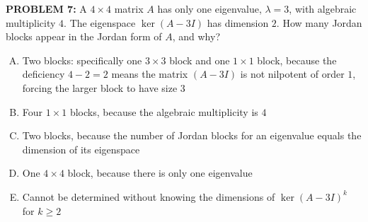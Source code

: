\documentclass[12pt]{amsart}
\begin{document}
{\bf PROBLEM 7:}
%
A $4 \times 4$ matrix $A$ has only one eigenvalue, $\lambda = 3$, with 
algebraic multiplicity $4$. The eigenspace $\ker(A - 3I)$ has dimension $2$.
%
How many Jordan blocks appear in the Jordan form of $A$, and why?

\begin{enumerate}[(A)]
\item Two blocks: specifically one $3 \times 3$ block and one $1 \times 1$
      block, because the deficiency $4 - 2 = 2$ means the matrix $(A - 3I)$
      is not nilpotent of order $1$, forcing the larger block to have size $3$
\item Four $1 \times 1$ blocks, because the algebraic multiplicity is $4$
\item Two blocks, because the number of Jordan blocks for an eigenvalue 
      equals the dimension of its eigenspace
\item One $4 \times 4$ block, because there is only one eigenvalue
\item Cannot be determined without knowing the dimensions of $\ker(A - 3I)^k$ for $k \geq 2$
\end{enumerate}
\end{document}
